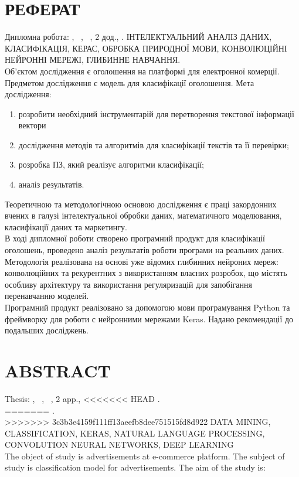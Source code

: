 \chapter*{РЕФЕРАТ}							%

Дипломна робота: , 
~,
~,
2 дод.,
.
ІНТЕЛЕКТУАЛЬНИЙ АНАЛІЗ ДАНИХ, КЛАСИФІКАЦІЯ, КЕРАС,
ОБРОБКА ПРИРОДНОЇ МОВИ, КОНВОЛЮЦІЙНІ НЕЙРОННІ МЕРЕЖІ, ГЛИБИННЕ НАВЧАННЯ.\\
Об’єктом дослідження є оголошення на платформі для електронної комерції. Предметом дослідження є модель для класифікації оголошення.
Мета дослідження:
\begin{enumerate}
	\item розробити необхідний інструментарій для перетворення текстової інформації вектори
	\item дослідження методів та алгоритмів для класифікації текстів та її перевірки;
	\item розробка ПЗ, який реалізує алгоритми класифікації;
    \item аналіз результатів.
\end{enumerate}

Теоретичною та методологічною основою дослідження є праці
закордонних вчених в галузі інтелектуальної обробки даних, математичного
моделювання, класифікації даних та маркетингу. \\
В ході дипломної роботи створено програмний продукт для класифікації оголошень, проведено аналіз результатів роботи програми на реальних даних. \\
Методологія реалізована на основі уже відомих глибинних нейроних мереж: конволюційних та рекурентних з використанням власних розробок, що містять особливу архітектуру та використання регуляризацій для запобігання перенавчанню моделей.\\
Програмний продукт реалізовано за допомогою мови програмування
Python та фреймворку для роботи с нейронними мережами Keras. Надано
рекомендації до подальших досліджень. \\


\chapter*{ABSTRACT}						


Thesis: , 
~,
~,
2 app.,
<<<<<<< HEAD
. \\
=======
.\\
>>>>>>> 3c3b3e4159f111ff13aeefb8dee751515fd8d922
DATA MINING, CLASSIFICATION, KERAS, NATURAL LANGUAGE PROCESSING, CONVOLUTION NEURAL NETWORKS, DEEP LEARNING \\
The object of study is advertisements at e-commerce
platform. The subject of study is classification model for
advertisements.
The aim of the study is:

